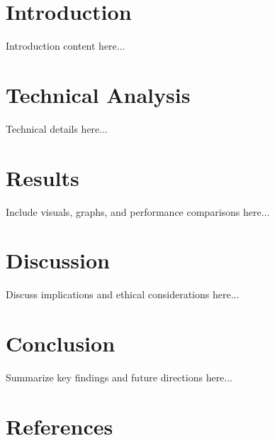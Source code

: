 \documentclass[a0,landscape]{a0poster}
\begin{document}
\begin{multicols}{3}
    \setlength{\columnsep}{20pt} %

    \section{Introduction}
    Introduction content here...

    \section{Technical Analysis}
    Technical details here...

    \section{Results}
    Include visuals, graphs, and performance comparisons here...

    \section{Discussion}
    Discuss implications and ethical considerations here...

    \section{Conclusion}
    Summarize key findings and future directions here...

    \section*{References}
    

\end{multicols}
\end{document}

